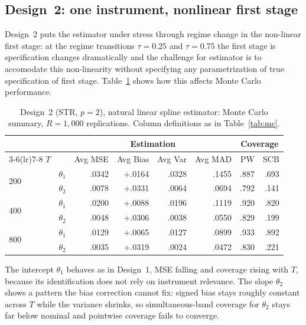 \documentclass[12pt]{article}
\begin{document}
\subsection{Design~2: one instrument, nonlinear first stage}

Design~2 puts the estimator under stress through regime change in the non-linear first stage: at the regime transitions $\tau = 0.25$ and $\tau = 0.75$ the first stage is specification changes dramatically and the challenge for estimator is to accomodate this non-linearity without specifying any parametrization of true specification of first stage. Table~\ref{tab:mc-str} shows how this affects Monte Carlo performance.

\begin{table}[H]
\centering
\caption{Design~2 (STR, $p = 2$), natural linear spline estimator: Monte Carlo summary, $R = 1{,}000$ replications. Column definitions as in Table~\ref{tab:mc}.}
\label{tab:mc-str}
\small
\begin{tabular}{@{}ll rrrr rr@{}}
\toprule
& & \multicolumn{4}{c}{Estimation} & \multicolumn{2}{c}{Coverage} \\
\cmidrule(lr){3-6}\cmidrule(lr){7-8}
$T$ & & Avg MSE & Avg Bias & Avg Var & Avg MAD & PW & SCB \\
\midrule
\multirow{2}{*}{200}
& $\theta_1$ & .0342 & $+$.0164 & .0328 & .1455 & .887 & .693 \\
& $\theta_2$ & .0078 & $+$.0331 & .0064 & .0694 & .792 & .141 \\
\midrule
\multirow{2}{*}{400}
& $\theta_1$ & .0200 & $+$.0088 & .0196 & .1119 & .920 & .820 \\
& $\theta_2$ & .0048 & $+$.0306 & .0038 & .0550 & .829 & .199 \\
\midrule
\multirow{2}{*}{800}
& $\theta_1$ & .0129 & $+$.0065 & .0127 & .0899 & .933 & .892 \\
& $\theta_2$ & .0035 & $+$.0319 & .0024 & .0472 & .830 & .221 \\
\bottomrule
\end{tabular}
\end{table}

The intercept $\theta_1$ behaves as in Design~1, MSE falling and coverage rising with $T$, because its identification does not rely on instrument relevance. The slope $\theta_2$ shows a pattern the bias correction cannot fix: signed bias stays roughly constant across $T$ while the variance shrinks, so simultaneous-band coverage for $\theta_2$ stays far below nominal and pointwise coverage fails to converge. 
\end{document}

